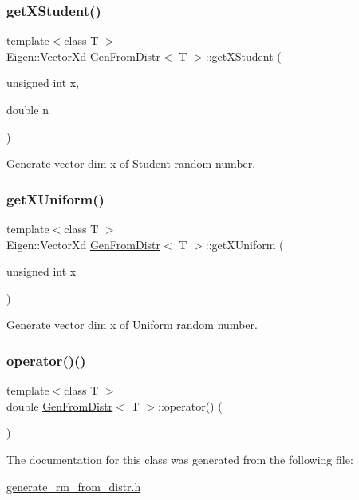 \subsubsection{\texorpdfstring{get\+X\+Student()}{getXStudent()}}
{\footnotesize\ttfamily template$<$class T $>$ \\
Eigen\+::\+Vector\+Xd \hyperlink{classGenFromDistr}{Gen\+From\+Distr}$<$ T $>$\+::get\+X\+Student (\begin{DoxyParamCaption}\item[{unsigned int}]{x,  }\item[{double}]{n }\end{DoxyParamCaption})\hspace{0.3cm}{\ttfamily [inline]}}



Generate vector dim x of Student random number. 

\hypertarget{classGenFromDistr_af37d022161571f1ed61462b999081b8e}{}\label{classGenFromDistr_af37d022161571f1ed61462b999081b8e} 
\subsubsection{\texorpdfstring{get\+X\+Uniform()}{getXUniform()}}
{\footnotesize\ttfamily template$<$class T $>$ \\
Eigen\+::\+Vector\+Xd \hyperlink{classGenFromDistr}{Gen\+From\+Distr}$<$ T $>$\+::get\+X\+Uniform (\begin{DoxyParamCaption}\item[{unsigned int}]{x }\end{DoxyParamCaption})\hspace{0.3cm}{\ttfamily [inline]}}



Generate vector dim x of Uniform random number. 

\hypertarget{classGenFromDistr_a759d5f09184069456bb02cf0687c04b8}{}\label{classGenFromDistr_a759d5f09184069456bb02cf0687c04b8} 
\subsubsection{\texorpdfstring{operator()()}{operator()()}}
{\footnotesize\ttfamily template$<$class T $>$ \\
double \hyperlink{classGenFromDistr}{Gen\+From\+Distr}$<$ T $>$\+::operator() (\begin{DoxyParamCaption}{ }\end{DoxyParamCaption})\hspace{0.3cm}{\ttfamily [inline]}}



The documentation for this class was generated from the following file\+:\begin{DoxyCompactItemize}
\item 
\hyperlink{generate__rm__from__distr_8h}{generate\+\_\+rm\+\_\+from\+\_\+distr.\+h}\end{DoxyCompactItemize}
